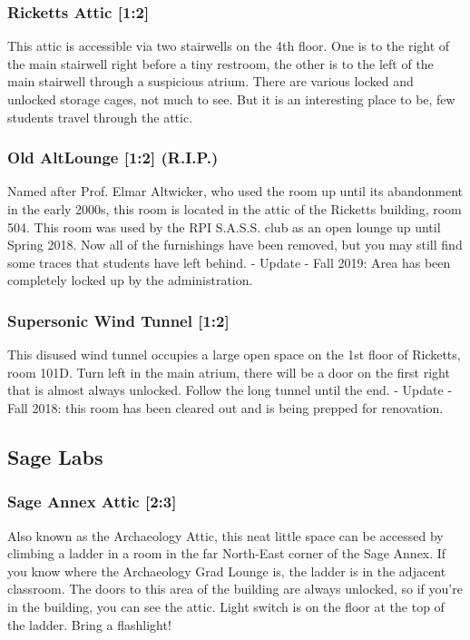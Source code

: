 \documentclass{article}
\begin{document}
\subsubsection{Ricketts Attic [1:2]}
This attic is accessible via two stairwells on the 4th floor. One is to the right of the main stairwell right before a tiny restroom, the other is to the left of the main stairwell through a suspicious atrium. There are various locked and unlocked storage cages, not much to see. But it is an interesting place to be, few students travel through the attic.
\subsubsection{Old AltLounge [1:2] (R.I.P.)}
Named after Prof. Elmar Altwicker, who used the room up until its abandonment in the early 2000s, this room is located in the attic of the Ricketts building, room 504. This room was used by the RPI S.A.S.S. club as an open lounge up until Spring 2018. Now all of the furnishings have been removed, but you may still find some traces that students have left behind.
- Update - Fall 2019: Area has been completely locked up by the administration.

 \subsubsection{Supersonic Wind Tunnel [1:2]}
This disused wind tunnel occupies a large open space on the 1st floor of Ricketts, room 101D. Turn left in the main atrium, there will be a door on the first right that is almost always unlocked. Follow the long tunnel until the end.
- Update - Fall 2018: this room has been cleared out and is being prepped for renovation.
\pagebreak
\subsection{Sage Labs}
\subsubsection{Sage Annex Attic [2:3]}
Also known as the Archaeology Attic, this neat little space can be accessed by climbing a ladder in a room in the far North-East corner of the Sage Annex. If you know where the Archaeology Grad Lounge is, the ladder is in the adjacent classroom. The doors to this area of the building are always unlocked, so if you’re in the building, you can see the attic. Light switch is on the floor at the top of the ladder. Bring a flashlight!
\end{document}
